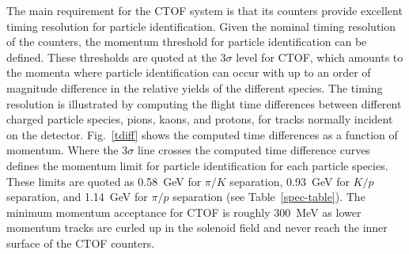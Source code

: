 \documentclass{elsart}
\begin{document}
The main requirement for the CTOF system is that its counters provide excellent timing resolution 
for particle identification. Given the nominal timing resolution of the counters, the momentum 
threshold for particle identification can be defined. These thresholds are quoted at the 3$\sigma$
level for CTOF, which amounts to the momenta where particle identification can occur with up to an
order of magnitude difference in the relative yields of the different species. The timing resolution is
illustrated by computing the flight time differences between different charged particle species, pions,
kaons, and protons, for tracks normally incident on the detector. Fig.~\ref{tdiff} shows the computed
time differences as a function of momentum. Where the 3$\sigma$ line crosses the computed time
difference curves defines the momentum limit for particle identification for each particle species.
These limits are quoted as 0.58~GeV for $\pi/K$ separation, 0.93~GeV for $K/p$ separation, and
1.14~GeV for $\pi/p$ separation (see Table~\ref{spec-table}). The minimum momentum acceptance
for CTOF is roughly 300~MeV as lower momentum tracks are curled up in the solenoid field and never
reach the inner surface of the CTOF counters.
\end{document}
